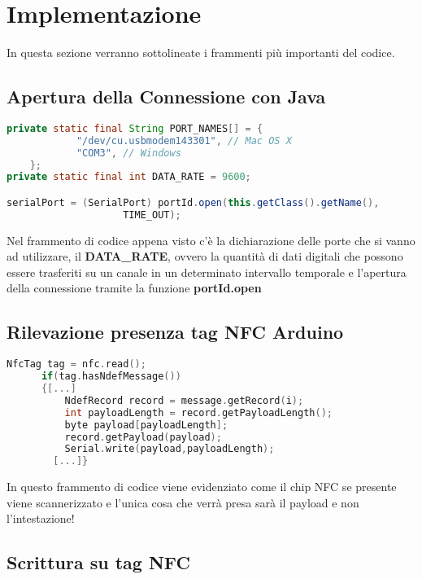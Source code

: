 \section{Implementazione}

In questa sezione verranno sottolineate i frammenti più importanti del codice.
\subsection{Apertura della Connessione con Java}
\begin{lstlisting}[language=Java]
private static final String PORT_NAMES[] = { 
			"/dev/cu.usbmodem143301", // Mac OS X
			"COM3", // Windows
	};
private static final int DATA_RATE = 9600;

serialPort = (SerialPort) portId.open(this.getClass().getName(),
					TIME_OUT);

\end{lstlisting}
Nel frammento di codice appena visto c'è la dichiarazione delle porte che si vanno ad utilizzare, il \textbf{DATA\_RATE}, ovvero la quantità di dati digitali che possono essere trasferiti su un canale in un determinato intervallo temporale e l'apertura della connessione tramite la funzione \textbf{portId.open}

\subsection{Rilevazione presenza tag NFC Arduino}
\begin{lstlisting}[language=c++]
      NfcTag tag = nfc.read(); 
      if(tag.hasNdefMessage())
      {[...]    
          NdefRecord record = message.getRecord(i);
          int payloadLength = record.getPayloadLength();
          byte payload[payloadLength];
          record.getPayload(payload);
          Serial.write(payload,payloadLength);
        [...]}
\end{lstlisting}
In questo frammento di codice viene evidenziato come il chip NFC se presente viene scannerizzato e l'unica cosa che verrà presa sarà il payload e non l'intestazione! 
\subsection{Scrittura su tag NFC}